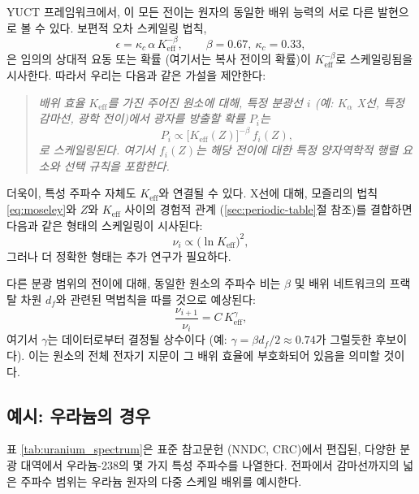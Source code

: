 \documentclass[12pt,a4paper]{article}
\begin{document}
	YUCT 프레임워크에서, 이 모든 전이는 원자의 동일한 배위 능력의 서로 다른 발현으로 볼 수 있다. 보편적 오차 스케일링 법칙,
	\begin{equation}
		\epsilon = \kappa_c \, \alpha \, K_{\mathrm{eff}}^{-\beta}, \qquad \beta = 0.67,\ \kappa_c = 0.33,
		\label{eq:universal_law}
	\end{equation}
	은 임의의 상대적 요동 또는 확률 (여기서는 복사 전이의 확률)이 \(K_{\mathrm{eff}}^{-\beta}\)로 스케일링됨을 시사한다. 따라서 우리는 다음과 같은 가설을 제안한다:
	
	\begin{quote}
		\emph{배위 효율 \(K_{\mathrm{eff}}\)를 가진 주어진 원소에 대해, 특정 분광선 \(i\) (예: \(K_\alpha\) X선, 특정 감마선, 광학 전이)에서 광자를 방출할 확률 \(P_i\)는}
		\begin{equation}
			P_i \propto \bigl[K_{\mathrm{eff}}(Z)\bigr]^{-\beta} \, f_i(Z),
			\label{eq:prob_scaling}
		\end{equation}
		\emph{로 스케일링된다. 여기서 \(f_i(Z)\)는 해당 전이에 대한 특정 양자역학적 행렬 요소와 선택 규칙을 포함한다.}
	\end{quote}
	
	더욱이, 특성 주파수 자체도 \(K_{\mathrm{eff}}\)와 연결될 수 있다. X선에 대해, 모즐리의 법칙 \eqref{eq:moseley}와 \(Z\)와 \(K_{\mathrm{eff}}\) 사이의 경험적 관계 (\ref{sec:periodic-table}절 참조)를 결합하면 다음과 같은 형태의 스케일링이 시사된다:
	\begin{equation}
		\nu_i \propto \bigl(\ln K_{\mathrm{eff}}\bigr)^2,
		\label{eq:freq_scaling}
	\end{equation}
	그러나 더 정확한 형태는 추가 연구가 필요하다.
	
	다른 분광 범위의 전이에 대해, 동일한 원소의 주파수 비는 \(\beta\) 및 배위 네트워크의 프랙탈 차원 \(d_f\)와 관련된 멱법칙을 따를 것으로 예상된다:
	\begin{equation}
		\frac{\nu_{i+1}}{\nu_i} = C \, K_{\mathrm{eff}}^{\gamma},
		\label{eq:ratio_scaling}
	\end{equation}
	여기서 \(\gamma\)는 데이터로부터 결정될 상수이다 (예: \(\gamma = \beta d_f/2 \approx 0.74\)가 그럴듯한 후보이다). 이는 원소의 전체 전자기 지문이 그 배위 효율에 부호화되어 있음을 의미할 것이다.
	
	\subsection{예시: 우라늄의 경우}
	
	표 \ref{tab:uranium_spectrum}은 표준 참고문헌 (NNDC, CRC)에서 편집된, 다양한 분광 대역에서 우라늄-238의 몇 가지 특성 주파수를 나열한다. 전파에서 감마선까지의 넓은 주파수 범위는 우라늄 원자의 다중 스케일 배위를 예시한다.
	
\end{document}
